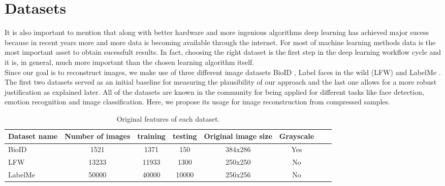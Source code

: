 \section{Datasets}
It is also important to mention that along with better hardware and more ingenious algorithms deep learning has achieved major sucess because in recent years more and more data is becoming available through the internet. For most of machine learning methods data is the most important asset to obtain sucessfult results. In fact, choosing the right dataset is the first step in the deep learning workflow cycle and it is, in general, much more important than the chosen learning algorithm itself. \\
Since our goal is to reconstruct images, we make use of three different image datasets BioID \cite{frischholz2003bioid}, Label faces in the wild (LFW) \cite{LFWTech} and LabelMe \cite{russell2008labelme}. The first two datasets served as an initial baseline for measuring the plausibility of our approach and the last one allows for a more robust justification as explained later. All of the datasets are known in the community for being applied for different tasks like face detection, emotion recognition and image classification. Here, we propose its usage for image reconstruction from compressed samples. \\
\begin{table}[tb]
\caption[Datasets for training and testing]{Original features of each dataset.}
\label{tab:datasets1}
\centering
\begin{tabular}{l*{6}{c}r}
Dataset name              & Number of images & training & testing &  Original image size& Grayscale \\
\hline
BioID   & 1521 & 1371 & 150 & 384x286 & Yes\\
LFW     & 13233 & 11933 & 1300 & 250x250 & No\\
LabelMe & 50000 & 40000 & 10000 & 256x256 & No\\
\bottomrule 
\end{tabular}  
\end{table}

